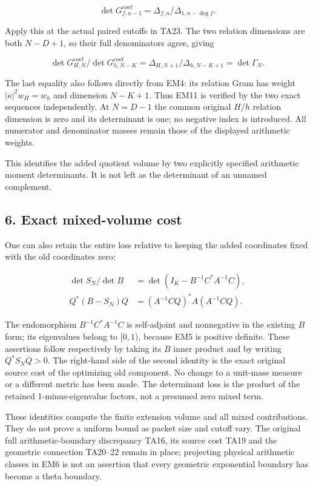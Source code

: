 \[
\det G_{f,n-1}^{\mathrm{coef}}=\Delta_{f,n}/\Delta_{1,n-\deg f}.
\]

Apply this at the actual paired cutoffs in TA23. The two relation
dimensions are both \(N-D+1\), so their full denominators agree, giving

\[
\det G_{H,N}^{\mathrm{coef}}/\det G_{h,N-K}^{\mathrm{coef}}=\Delta_{H,N+1}/\Delta_{h,N-K+1}=\det\Gamma_N.\tag{EM11}
\]

The last equality also follows directly from EM4: its relation Gram
has weight \(|\kappa|^2w_H=w_h\) and dimension \(N-K+1\). Thus EM11 is verified
by the two exact sequences independently. At \(N=D-1\) the common original
\(H/h\) relation dimension is zero and its determinant is one; no negative
index is introduced. All numerator and denominator masses remain those
of the displayed arithmetic weights.

This identifies the added quotient volume by two explicitly specified
arithmetic moment determinants. It is not left as the determinant of
an unnamed complement.

\subsection{6. Exact mixed-volume cost}\label{exact-mixed-volume-cost}

One can also retain the entire loss relative to keeping the added
coordinates fixed with the old coordinates zero:

\[
\begin{aligned}\det S_N/\det B&=\det(I_K-B^{-1}C^*A^{-1}C),\\Q^*(B-S_N)Q&=(A^{-1}CQ)^*A(A^{-1}CQ).\end{aligned}\tag{EM12}
\]

The endomorphism \(B^{-1}C^*A^{-1}C\) is self-adjoint and nonnegative in
the existing \(B\) form; its eigenvalues belong to \([0,1)\), because EM5 is
positive definite. These assertions follow respectively by taking its
\(B\) inner product and by writing \(Q^*S_NQ>0\). The right-hand side of
the second identity is the exact original source cost of the optimizing
old component. No change to a unit-mass measure or a different metric
has been made. The determinant loss is the product of the retained
1-minus-eigenvalue factors, not a presumed zero mixed term.

These identities compute the finite extension volume and all mixed
contributions. They do not prove a uniform bound as packet size and
cutoff vary. The original full arithmetic-boundary discrepancy TA16,
its source cost TA19 and the geometric connection TA20--22 remain in
place; projecting physical arithmetic classes in EM6 is not an assertion
that every geometric exponential boundary has become a theta boundary.

